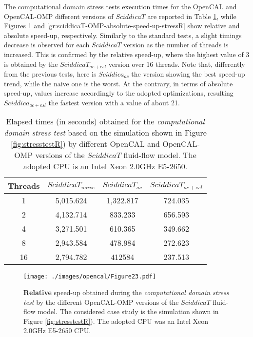 The computational domain stress tests execution times for the
OpenCAL and OpenCAL-OMP different versions of $SciddicaT$ are
reported in Table \ref{tab:sciddicaT-OMP-execution-times-stressR},
while Figures \ref{gr:sciddicaT-OMP-relative-speed-up-stressR} and
\ref{gr:sciddicaT-OMP-absolute-speed-up-stressR} show relative and
absolute speed-up, respectively. Similarly to the standard tests,
a slight timings decrease is observed for each $SciddicaT$ version
as the number of threads is increased. This is confirmed by the
relative speed-up, where the highest value of 3 is obtained by the
$SciddicaT_{ac+esl}$ version over 16 threads. Note that,
differently from the previous tests, here is $Sciddica_{ac}$ the
version showing the best speed-up trend, while the naive one is
the worst. At the contrary, in terms of absolute speed-up, values
increase accordingly to the adopted optimizations, resulting
$Sciddica_{ac+esl}$ the fastest version with a value of about 21.
\begin{table}
	\centering
	\begin{tabular}{cccc}
		\hline Threads & $SciddicaT_{naive}$ & $SciddicaT_{ac}$ &
		$SciddicaT_{ac+esl}$\\ \hline 1 & 5,015.624 & 1,322.817 &
		724.035\\ 2 & 4,132.714 & 833.233 & 656.593\\ 4 & 3,271.501 &
		610.365 & 349.662\\ 8 & 2,943.584 & 478.984 & 272.623\\ 16 &
		2,794.782 & 412584 & 237.513\\ \hline
	\end{tabular}
	\caption[Elapsed times obtained for the \emph{computational domain stress test} by different OpenCAL and OpenCAL-OMP versions
	of the $SciddicaT$ fluid-flow model.]{Elapsed times (in seconds) obtained for the \emph{computational domain stress test} based on the simulation shown in Figure \ref{fig:stresstestR}) by different OpenCAL and OpenCAL-OMP versions
	of the $SciddicaT$ fluid-flow model. The adopted CPU is an Intel Xeon
	2.0GHz E5-2650.}
	\label{tab:sciddicaT-OMP-execution-times-stressR}
\end{table}

\begin{figure}
	\begin{center}
		\texttt{[image: ./images/opencal/Figure23.pdf]}
		\caption[\textbf{Relative} speed-up obtained during the \emph{computational domain stress test} by the different OpenCAL-OMP versions of the
		$SciddicaT$ fluid-flow model.]{\textbf{Relative} speed-up obtained during the \emph{computational domain
				stress test} by the different OpenCAL-OMP versions of the
			$SciddicaT$ fluid-flow model. The considered case study is the
			simulation shown in Figure \ref{fig:stresstestR}). The adopted CPU was
			an Intel Xeon 2.0GHz E5-2650 CPU.}
		\label{gr:sciddicaT-OMP-relative-speed-up-stressR}
	\end{center}
\end{figure}

